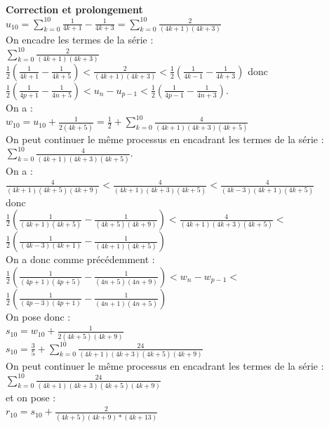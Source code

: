 \documentclass[a4paper,11pt]{book}
\begin{document}
{\bf Correction et prolongement}\\
$\displaystyle  u_{10}=\sum_{k=0}^{10} \frac{1}{4k+1}-\frac{1}{4k+3}=\sum_{k=0}^{10} \frac{2}{(4k+1)(4k+3)}$\\
On encadre les termes de la s\'erie :\\
$\displaystyle \sum_{k=0}^{10} \frac{2}{(4k+1)(4k+3)}$\\
$\displaystyle \frac{1}{2}(\frac{1}{4k+1}-\frac{1}{4k+5})<\frac{2}{(4k+1)(4k+3)}<\frac{1}{2}(\frac{1}{4k-1}-\frac{1}{4k+3})$
donc \\
$\displaystyle \frac{1}{2}(\frac{1}{4p+1}-\frac{1}{4n+5})<u_n-u_{p-1}<\frac{1}{2}(\frac{1}{4p-1}-\frac{1}{4n+3})$.\\
On a :\\
$ \displaystyle w_{10}= u_{10}+\frac{1}{2(4k+5)}=\frac{1}{2}+\sum_{k=0}^{10} \frac{4}{(4k+1)(4k+3)(4k+5)}$\\
On peut continuer le m\^eme processus en encadrant les termes de la s\'erie :\\
$\displaystyle \sum_{k=0}^{10} \frac{4}{(4k+1)(4k+3)(4k+5)}$.\\
On a :\\
$\displaystyle \frac{4}{(4k+1)(4k+5)(4k+9)}<\frac{4}{(4k+1)(4k+3)(4k+5)}<\frac{4}{(4k-3)(4k+1)(4k+5)}$\\
donc \\
$\displaystyle \frac{1}{2}(\frac{1}{(4k+1)(4k+5)}-\frac{1}{(4k+5)(4k+9)})<\frac{4}{(4k+1)(4k+3)(4k+5)}<$\\
$\displaystyle \frac{1}{2}(\frac{1}{(4k-3)(4k+1)}-\frac{1}{(4k+1)(4k+5)})$\\
On a donc comme pr\'ec\'edemment :\\
$\displaystyle \frac{1}{2}(\frac{1}{(4p+1)(4p+5)}-\frac{1}{(4n+5)(4n+9)})<w_n-w_{p-1}<$\\
$\displaystyle \frac{1}{2}(\frac{1}{(4p-3)(4p+1)}-\frac{1}{(4n+1)(4n+5)})$\\
On pose donc :\\
$\displaystyle s_{10}= w_{10}+\frac{1}{2(4k+5)(4k+9)}$\\
$\displaystyle s_{10}=\frac{3}{5}+\sum_{k=0}^{10} \frac{24}{(4k+1)(4k+3)(4k+5)(4k+9)}$\\
On peut continuer le m\^eme processus en encadrant les termes de la s\'erie :\\
$\displaystyle \sum_{k=0}^{10} \frac{24}{(4k+1)(4k+3)(4k+5)(4k+9)}$\\
et on pose :\\
$\displaystyle r_{10}= s_{10}+\frac{2}{(4k+5)(4k+9)*(4k+13)}$\\
\end{document}
